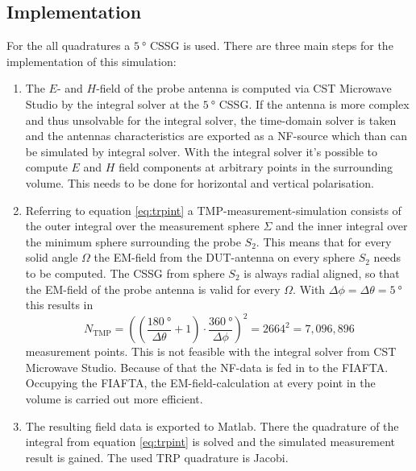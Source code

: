 \subsection{Implementation}

For the all quadratures a $\SI{5}{\degree}$ \ac{CSSG} is used. There are three main steps for the implementation of this simulation:

\begin{enumerate}
\item The $E$- and $H$-field of the probe antenna is computed via CST Microwave Studio\texttrademark{} by the integral solver at the $\SI{5}{\degree}$ \ac{CSSG}. If the antenna is more complex and thus unsolvable for the integral solver, the time-domain solver is taken and the antennas characteristics are exported as a \ac{NF}-source which than can be simulated by integral solver. With the integral solver it's possible to compute $E$ and $H$ field components at arbitrary points in the surrounding volume. This needs to be done for horizontal and vertical polarisation.
\item Referring to equation \ref{eq:trpint} a \ac{TMP}-measurement-simulation consists of the outer integral over the measurement sphere $\Sigma$ and the inner integral over the minimum sphere surrounding the probe $S_2$. This means that for every solid angle $\Omega$ the \ac{EM}-field from the \ac{DUT}-antenna on every sphere $S_2$ needs to be computed. The \ac{CSSG} from sphere $S_2$ is always radial aligned, so that the \ac{EM}-field of the probe antenna is valid for every $\Omega$. With $\Delta\phi=\Delta\theta=\SI{5}{\degree}$ this results in
\begin{equation}
N_\text{TMP}=\left(\left(\frac{\SI{180}{\degree}}{\Delta\theta}+1\right)\cdot\frac{\SI{360}{\degree}}{\Delta\phi}\right)^2=2664^2=7,096,896
\end{equation}
measurement points. This is not feasible with the integral solver from CST Microwave Studio\texttrademark{}. Because of that the \ac{NF}-data is fed in to the \ac{FIAFTA}. Occupying the \ac{FIAFTA}, the \ac{EM}-field-calculation at every point in the volume is carried out more efficient.\cite{mypaper} \cite{fiafta}
\item The resulting field data is exported to Matlab\texttrademark{}. There the quadrature of the integral from equation \ref{eq:trpint} is solved and the simulated measurement result is gained. The used \ac{TRP} quadrature is Jacobi.
\end{enumerate} 

